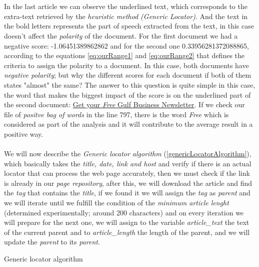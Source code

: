\\\\
In the last article we can observe the underlined text, which corresponds to the extra-text retrieved by the \emph{heuristic method (Generic Locator)}. And the text in the bold letters represents the part of speech extracted from the text, in this case doesn't affect the \emph{polarity} of the document. For the first document we had a negative score: -1.06451389862862 and for the second one 0.33956281372088865, according to the equations \ref{eq:ourRange1} and \ref{eq:ourRange2} that defines the criteria to assign the polarity to a document. In this case, both documents have \emph{negative polarity}; but why the different scores for each document if both of them states "almost" the same? The answer to this question is quite simple in this case, the word that makes the biggest impact of the score is on the underlined part of the second document: \ul{Get your \emph{Free} Gulf Business Newsletter}. If we check our file of \emph{positve bag of words}  \cite{M1995} in the line 797, there is the word \emph{Free} which is considered as part of the analysis and it will contribute to the average result in a positive way.
\\\\
We will now describe the \emph{Generic locator algorithm} (\ref{genericLocatorAlgorithm}), which basically takes the \emph{title, date, link and host} and verify if there is an actual locator that can process the web page accurately, then we must check if the link is already in our \emph{page repository}, after this, we will download the article and find the \emph{tag} that contains the \emph{title}, if we found it we will assign the \emph{tag} as \emph{parent} and we will iterate until we fulfill the condition of the \emph{minimum article lenght} (determined experimentally; around 200 characters) and on every iteration we will prepare for the next one, we will assign to the variable \emph{article\_text} the text of the current parent and to \emph{article\_length} the length of the parent, and we will update the \emph{parent} to its \emph{parent}.

\begin{algorithm}
\caption{Generic locator algorithm}\label{genericLocatorAlgorithm}
\end{algorithm}

